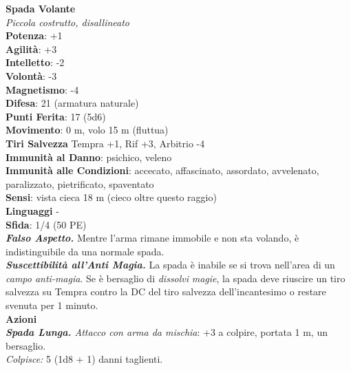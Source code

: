 \begin{multicols}{2}
\medskip\textbf{Spada Volante}\\
\emph{Piccola costrutto, disallineato}\\
\textbf{Potenza}: +1\\
\textbf{Agilità}: +3\\
\textbf{Intelletto}: -2\\
\textbf{Volontà}: -3\\
\textbf{Magnetismo}: -4\\
\textbf{Difesa}: 21 (armatura naturale)\\
\textbf{Punti Ferita}: 17 (5d6)\\
\textbf{Movimento}: 0 m, volo 15 m (fluttua)\\
\textbf{Tiri Salvezza}  Tempra +1, Rif +3, Arbitrio -4\\
\textbf{Immunità al Danno}: psichico, veleno\\
\textbf{Immunità alle Condizioni}: accecato, affascinato, assordato, avvelenato, paralizzato, pietrificato, spaventato\\
\textbf{Sensi}: vista cieca 18 m (cieco oltre questo raggio)\\
\textbf{Linguaggi} -\\
\textbf{Sfida}: 1/4 (50 PE)\smallskip\\
\emph{\textbf{Falso Aspetto.}} Mentre l'arma rimane immobile e non sta volando, è indistinguibile da una normale spada.\\
\emph{\textbf{Suscettibilità all'Anti Magia.}} La spada è inabile se si trova nell'area di un \emph{campo anti-magia}. Se è bersaglio di \emph{dissolvi} \emph{magie}, la spada deve riuscire un tiro salvezza su Tempra contro la DC del tiro salvezza dell'incantesimo o restare svenuta per 1 minuto.\\
\smallskip\textbf{Azioni}\\
\emph{\textbf{Spada Lunga.} Attacco con arma da mischia}: +3 a colpire, portata 1 m, un bersaglio.\\
\emph{Colpisce:} 5 (1d8 + 1) danni taglienti.\\


\end{multicols}
